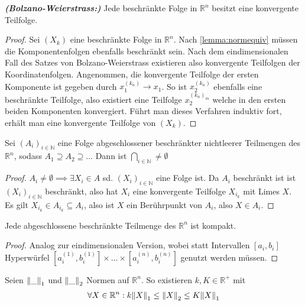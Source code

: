 \documentclass{report}
\newcommand{\bN}{\mathbb{N}}
\newcommand{\bR}{\mathbb{R}}
\begin{document}
\begin{theorem}
\emph{\textbf{(Bolzano-Weierstrass:)}} Jede beschränkte Folge in $\bR^n$ besitzt eine konvergente Teilfolge.
\end{theorem}
\begin{proof}
 Sei $(X_k)$ eine beschränkte Folge in $\bR^n$. Nach \ref{lemma:normequiv} müssen die Komponentenfolgen ebenfalls beschränkt sein. Nach dem eindimensionalen Fall des Satzes von Bolzano-Weierstrass existieren also konvergente Teilfolgen der Koordinatenfolgen. Angenommen, die konvergente Teilfolge der ersten Komponente ist gegeben durch $x_1^{(k_n)} \to x_1$. So ist $x_2^{(k_n)}$ ebenfalls eine beschränkte Teilfolge, also existiert eine Teilfolge $x_2^{(k_n)_m}$ welche in den ersten beiden Komponenten konvergiert. Führt man dieses Verfahren induktiv fort, erhält man eine konvergente Teilfolge von $(X_k)$.
\end{proof}
\begin{theorem}
 Sei $(A_i)_{i \in \bN}$ eine Folge abgeschlossener beschränkter nichtleerer Teilmengen des $\bR^n$, sodass $A_1 \supseteq A_2 \supseteq \hdots$ Dann ist $\bigcap_{i \in \bN} \neq \emptyset$
\end{theorem}
\begin{proof}
 $A_i \neq \emptyset \implies \exists X_i \in A$ sd. $(X_i)_{i \in \bN}$ eine Folge ist. Da $A_i$ beschränkt ist ist $(X_i)_{i \in \bN}$ beschränkt, also hat $X_i$ eine konvergente Teilfolge $X_{i_k}$ mit Limes $X$. Es gilt $X_{i_k} \in A_{i_k} \subseteq A_i$, also ist $X$ ein Berührpunkt von $A_i$, also $X \in A_i$.
\end{proof}
\begin{theorem}
 Jede abgeschlossene beschränkte Teilmenge des $\bR^n$ ist kompakt.
\end{theorem}
\begin{proof}
 Analog zur eindimensionalen Version, wobei statt Intervallen $[a_i,b_i]$ Hyperwürfel $[a_i^{(1)}, b_i^{(1)}] \times \hdots \times [a_i^{(n)}, b_i^{(n)}]$ genutzt werden müssen.
\end{proof}
\begin{theorem}
\label{theorem:allnormsequiv}
 Seien $\norm{\_}_1$ und $\norm{\_}_2$ Normen auf $\bR^n$. So existieren $k, K \in \bR^+$ mit
 \begin{align*}
  \forall X \in \bR^n : k\norm{X}_1 \leq \norm{X}_2 \leq K\norm{X}_1
 \end{align*}
\end{theorem}
\end{document}
